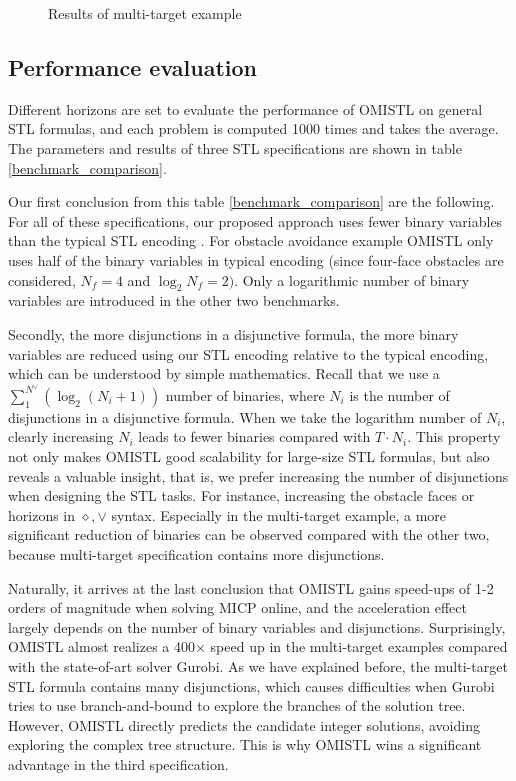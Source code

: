\documentclass[a4paper]{report}
\begin{document}
\begin{figure}[!htb]
    \caption{Results of multi-target example }
    \label{multi_targets}
\end{figure}

\subsection{Performance evaluation}

Different horizons are set to evaluate the performance of OMISTL on general STL formulas, and each problem is computed 1000 times and takes the average. The parameters and results of three STL specifications are shown in table \ref{benchmark_comparison}. 

Our first conclusion from this table \ref*{benchmark_comparison} are the following. For all of these specifications, our proposed approach uses fewer binary variables than the typical STL encoding \cite[]{2019Formal}\cite[]{Cauligi2020}. For obstacle avoidance example OMISTL only uses half of the binary variables in typical encoding (since four-face obstacles are considered, $N_f=4$ and $\log_2N_f=2 )$. Only a logarithmic number of binary variables are introduced in the other two benchmarks. 

Secondly, the more disjunctions in a disjunctive formula, the more binary variables are reduced using our STL encoding relative to the typical encoding, which can be understood by simple mathematics. Recall that we use a $\sum_{1}^{N^\lor}(\log_2(N_i+1))$ number of binaries, where $N_i$ is the number of disjunctions in a disjunctive formula. When we take the logarithm number of $N_i$, clearly increasing $N_i$ leads to fewer binaries compared with $T \cdot N_i$. This property not only makes OMISTL good scalability for large-size STL formulas, but also reveals a valuable insight, that is, we prefer increasing the number of disjunctions when designing the STL tasks. For instance, increasing the obstacle faces or horizons in $\diamond, \vee$ syntax. Especially in the multi-target example, a more significant reduction of binaries can be observed compared with the other two, because multi-target specification contains more disjunctions. 

Naturally, it arrives at the last conclusion that OMISTL gains speed-ups of 1-2 orders of magnitude when solving MICP online, and the acceleration effect largely depends on the number of binary variables and disjunctions. Surprisingly, OMISTL almost realizes a 400$\times$  speed up in the multi-target examples compared with the state-of-art solver Gurobi. As we have explained before, the multi-target STL formula contains many disjunctions, which causes difficulties when Gurobi tries to use branch-and-bound to explore the branches of the solution tree. However, OMISTL directly predicts the candidate integer solutions, avoiding exploring the complex tree structure. This is why OMISTL wins a significant advantage in the third specification.
\end{document}
